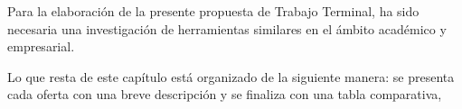 Para la elaboración de la presente propuesta de Trabajo Terminal, ha sido necesaria una investigación de herramientas similares en el ámbito académico y empresarial.


Lo que resta de este capítulo está organizado de la siguiente manera: se presenta cada oferta con una breve descripción y se finaliza con una tabla comparativa,







%



